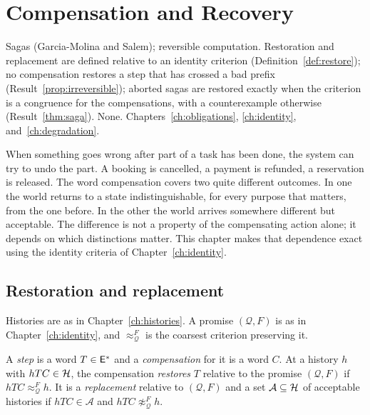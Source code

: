 \chapter{Compensation and Recovery}\label{ch:compensation}
{Sagas (Garcia-Molina and Salem); reversible computation.}
{Restoration and replacement are defined relative to an identity criterion (Definition~\ref{def:restore}); no compensation restores a step that has crossed a bad prefix (Result~\ref{prop:irreversible}); aborted sagas are restored exactly when the criterion is a congruence for the compensations, with a counterexample otherwise (Result~\ref{thm:saga}).}
{None.}
{Chapters~\ref{ch:obligations}, \ref{ch:identity}, and~\ref{ch:degradation}.}

When something goes wrong after part of a task has been done, the system can try to undo the part. A booking is cancelled, a payment is refunded, a reservation is released. The word compensation covers two quite different outcomes. In one the world returns to a state indistinguishable, for every purpose that matters, from the one before. In the other the world arrives somewhere different but acceptable. The difference is not a property of the compensating action alone; it depends on which distinctions matter. This chapter makes that dependence exact using the identity criteria of Chapter~\ref{ch:identity}.

\section{Restoration and replacement}

Histories are as in Chapter~\ref{ch:histories}. A promise $(\mathcal Q,F)$ is as in Chapter~\ref{ch:identity}, and $\approx^{F}_{\mathcal Q}$ is the coarsest criterion preserving it.

\begin{definition}\label{def:restore}
A \emph{step} is a word $T\in\mathsf{E}^{*}$ and a \emph{compensation} for it is a word $C$. At a history $h$ with $hTC\in\mathcal{H}$, the compensation \emph{restores} $T$ relative to the promise $(\mathcal Q,F)$ if $hTC\approx^{F}_{\mathcal Q}h$. It is a \emph{replacement} relative to $(\mathcal Q,F)$ and a set $\mathcal A\subseteq\mathcal{H}$ of acceptable histories if $hTC\in\mathcal A$ and $hTC\not\approx^{F}_{\mathcal Q}h$.
\end{definition}

